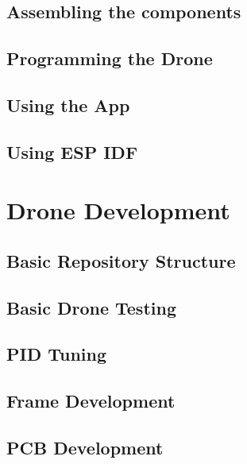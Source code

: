\documentclass[12pt, titlepage]{article}
\begin{document}
\subsection{Assembling the components}

\subsection{Programming the Drone}

\subsection{Using the App}

\subsection{Using ESP IDF}

\section{Drone Development}

\subsection{Basic Repository Structure}

\subsection{Basic Drone Testing}

\subsection{PID Tuning}

\subsection{Frame Development}

\subsection{PCB Development}
\end{document}
